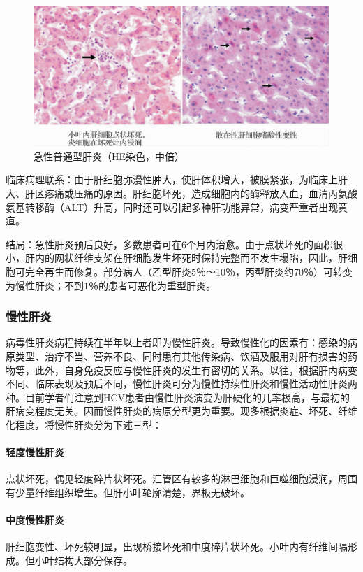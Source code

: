 \begin{figure}[!htbp]
 \centering
 \includegraphics{./images/Image00135.jpg}
 \captionsetup{justification=centering}
 \caption{急性普通型肝炎（HE染色，中倍）}
 \label{fig8-7}
  \end{figure} 

临床病理联系：由于肝细胞弥漫性肿大，使肝体积增大，被膜紧张，为临床上肝大、肝区疼痛或压痛的原因。肝细胞坏死，造成细胞内的酶释放入血，血清丙氨酸氨基转移酶（ALT）升高，同时还可以引起多种肝功能异常，病变严重者出现黄疸。

结局：急性肝炎预后良好，多数患者可在6个月内治愈。由于点状坏死的面积很小，肝内的网状纤维支架在肝细胞发生坏死时保持完整而不发生塌陷，因此，肝细胞可完全再生而修复。部分病人（乙型肝炎5％～10％，丙型肝炎约70％）可转变为慢性肝炎；不到1％的患者可恶化为重型肝炎。

\subsubsection{慢性肝炎}

病毒性肝炎病程持续在半年以上者即为慢性肝炎。导致慢性化的因素有：感染的病原类型、治疗不当、营养不良、同时患有其他传染病、饮酒及服用对肝有损害的药物等，此外，自身免疫反应与慢性肝炎的发生有密切的关系。以往，根据肝内病变不同、临床表现及预后不同，慢性肝炎可分为慢性持续性肝炎和慢性活动性肝炎两种。目前学者们注意到HCV患者由慢性肝炎演变为肝硬化的几率极高，与最初的肝病变程度无关。因而慢性肝炎的病原分型更为重要。现多根据炎症、坏死、纤维化程度，将慢性肝炎分为下述三型：

\paragraph{轻度慢性肝炎}
点状坏死，偶见轻度碎片状坏死。汇管区有较多的淋巴细胞和巨噬细胞浸润，周围有少量纤维组织增生。但肝小叶轮廓清楚，界板无破坏。

\paragraph{中度慢性肝炎}
肝细胞变性、坏死较明显，出现桥接坏死和中度碎片状坏死。小叶内有纤维间隔形成。但小叶结构大部分保存。

